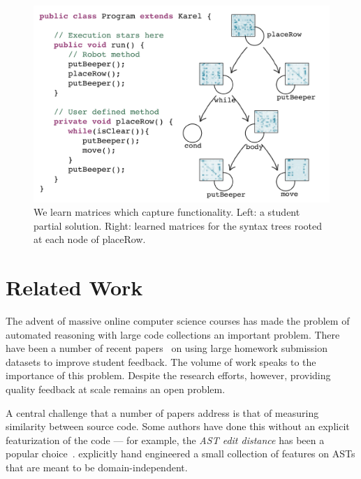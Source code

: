\begin{figure}[t]
\centering
\includegraphics[width=.65\columnwidth]{img/splash2_noborder}
\caption[Schematic of program embedding hierarchy]{We learn matrices which capture functionality. Left: a student partial solution. Right: learned matrices for the syntax trees rooted at each node of placeRow.}
\label{fig:splash}
\end{figure}

\section{Related Work}\label{sec:related}
The advent of massive online computer science courses 
has made the problem of automated reasoning with large code
collections an important problem.
There have been a number of recent papers~\cite{huangetal13,basu2013powergrading,nguyen14,brooks2014divide,lan2015mathematical, piech2015} on using large
homework submission datasets to improve student feedback. The volume of work speaks to the importance of this problem. Despite the research efforts, however, providing quality feedback at scale remains an open problem. 

A central challenge that a number of papers
 address is that of measuring similarity between 
source code.
Some authors have done this without an explicit 
featurization of the code ---
for example, the \emph{AST edit distance} has been a popular choice~\cite{huangetal13,rogers2014aces}.
\cite{mokbel2013domain} explicitly 
hand engineered a small collection of features on ASTs
that are meant to be domain-independent. 

